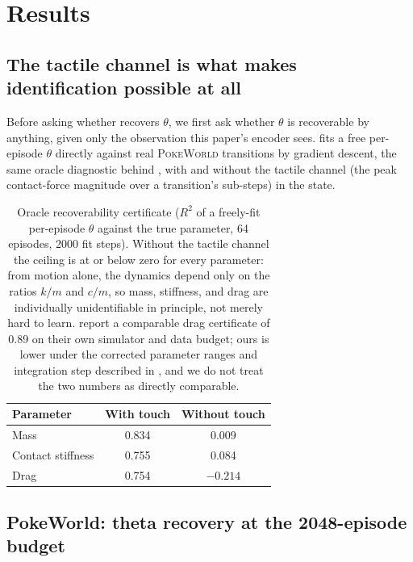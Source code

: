 \section{Results}
\label{sec:results}

\subsection{The tactile channel is what makes identification possible at all}
\label{sec:results-certificate}

Before asking whether \method recovers $\theta$, we first ask whether
$\theta$ is recoverable by anything, given only the observation this
paper's encoder sees.  fits a free
per-episode $\theta$ directly against real \textsc{PokeWorld}
transitions by gradient descent, the same oracle diagnostic behind
, with and without the tactile channel
(the peak contact-force magnitude over a transition's sub-steps) in the
state.

\begin{table}[t]
\centering
\begin{tabular}{lcc}
\toprule
Parameter & With touch & Without touch \\
\midrule
Mass               & 0.834  & 0.009  \\
Contact stiffness  & 0.755  & 0.084  \\
Drag               & 0.754  & $-0.214$ \\
\bottomrule
\end{tabular}
\caption{Oracle recoverability certificate ($R^2$ of a freely-fit
per-episode $\theta$ against the true parameter, 64 episodes, 2000 fit
steps). Without the tactile channel the ceiling is at or below zero for
every parameter: from motion alone, the dynamics depend only on the
ratios $k/m$ and $c/m$, so mass, stiffness, and drag are individually
unidentifiable in principle, not merely hard to learn. \citet{latent-wm-identifiability}
report a comparable drag certificate of 0.89 on their own simulator and
data budget; ours is lower under the corrected parameter ranges and
integration step described in , and we do
not treat the two numbers as directly comparable.}
\label{tab:touch-certificate}
\end{table}

\subsection{PokeWorld: theta recovery at the 2048-episode budget}
\label{sec:results-pokeworld}

